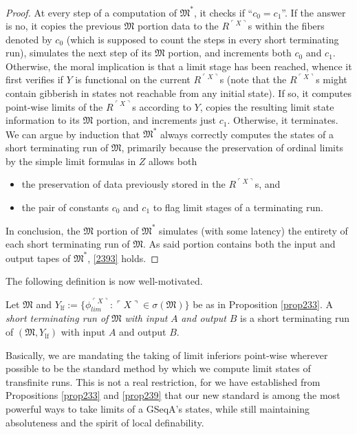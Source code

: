 \documentclass[12pt]{article}
\numberwithin{equation}{section}
\begin{document}
\begin{proof}
At every step of a computation of $\mathfrak{M}^*$, it checks if ``$c_0 = c_1$''. If the answer is no, it copies the previous $\mathfrak{M}$ portion data to the $R^{\ulcorner X \urcorner}$s within the fibers denoted by $c_0$ (which is supposed to count the steps in every short terminating run), simulates the next step of its $\mathfrak{M}$ portion, and increments both $c_0$ and $c_1$. Otherwise, the moral implication is that a limit stage has been reached, whence it first verifies if $Y$ is functional on the current $R^{\ulcorner X \urcorner}$s (note that the $R^{\ulcorner X \urcorner}$s might contain gibberish in states not reachable from any initial state). If so, it computes point-wise limits of the $R^{\ulcorner X \urcorner}$s according to $Y$, copies the resulting limit state information to its $\mathfrak{M}$ portion, and increments just $c_1$. Otherwise, it terminates. We can argue by induction that $\mathfrak{M}^*$ always correctly computes the states of a short terminating run of $\mathfrak{M}$, primarily because the preservation of ordinal limits by the simple limit formulas in $Z$ allows both
\begin{itemize}
    \item the preservation of data previously stored in the $R^{\ulcorner X \urcorner}$s, and
    \item the pair of constants $c_0$ and $c_1$ to flag limit stages of a terminating run.
\end{itemize} 

In conclusion, the $\mathfrak{M}$ portion of $\mathfrak{M}^*$ simulates (with some latency) the entirety of each short terminating run of $\mathfrak{M}$. As said portion contains both the input and output tapes of $\mathfrak{M}^*$, \ref{2393} holds.
\end{proof}

The following definition is now well-motivated.

\begin{defi}
Let $\mathfrak{M}$ and $Y_{\mathrm{lf}} := \{\phi_{lim}^{\ulcorner X \urcorner} : \ulcorner X \urcorner \in \sigma(\mathfrak{M})\}$ be as in Proposition \ref{prop233}. A \emph{short terminating run of} $\mathfrak{M}$ \emph{with input} $A$ \emph{and output} $B$ is a short terminating run of $(\mathfrak{M}, Y_{\mathrm{lf}})$ with input $A$ and output $B$.
\end{defi}

Basically, we are mandating the taking of limit inferiors point-wise wherever possible to be the standard method by which we compute limit states of transfinite runs. This is not a real restriction, for we have established from Propositions \ref{prop233} and \ref{prop239} that our new standard is among the most powerful ways to take limits of a GSeqA's states, while still maintaining absoluteness and the spirit of local definability.
\end{document}
